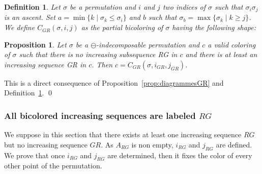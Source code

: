 \documentclass[11pt]{article}
\newenvironment{pf}{{\em \noindent Proof:}}{ \hfill \qed\smallskip}
\newcommand{\Vpoint}[2]{\draw (#1,#2) [darkgreen,fill=darkgreen] circle (3pt);}
\newcommand{\Hpoint}[2]{\draw (#1,#2) [darkred,fill=darkred] circle (3pt);}
\newcommand{\zoneGR}[3]{
\draw [very thick,H,Hpoint] (#1,#2) -- +(-#3,0);
\draw [very thick,V,Vpoint] (#1,#2) -- +(0,#3);
\draw [Vfill] (#1,#2) -- +(-#3,#3) -- +(-#3,0);
\draw [Hfill] (#1,#2) -- +(-#3,#3) -- + (0,#3);
}
\newtheorem{prop}[thm]{Proposition}
\newtheorem{defn}[thm]{Definition}
\newcommand{\ascentRG}{increasing sequence $RG$\xspace}
\newcommand{\ascentGR}{increasing sequence $GR$\xspace}
\newcounter{indice}
\begin{document}
\begin{defn}\label{def:C_GR}
Let $\sigma$ be a permutation and $i$ and $j$ two indices of $\sigma$ such that $\sigma_i \sigma_j$ is an ascent.
Set $a = \min \{k \mid \sigma_k \leq \sigma_i\}$ and $b$ such that $\sigma_b = \max \{\sigma_k \mid k \geq j\}$.
We define $C_{GR}(\sigma, i, j)$ as the partial bicoloring of $\sigma$ having the following shape:

\end{defn}


\begin{prop}\label{prop:C_GR}
Let $\sigma$ be a $\ominus$-indecomposable permutation and $c$ a valid coloring of $\sigma$ such that there is no increasing subsequence RG in $c$ and there is at least an increasing sequence GR in $c$. 
Then $c = C_{GR}(\sigma, i_{GR}, j_{GR})$.
\end{prop}

\begin{pf}
This is a direct consequence of Proposition~\ref{prop:diagrammesGR} and Definition~\ref{def:C_GR}.
\end{pf}


\subsubsection{All bicolored increasing sequences are labeled $RG$}

We suppose in this section that there exists at least one \ascentRG but no \ascentGR.
As $A_{RG}$ is non empty, $i_{RG}$ and $j_{RG}$ are defined.
We prove that once $i_{RG}$ and $j_{RG}$ are determined, then it fixes the color of every other point of the permutation.
\end{document}
